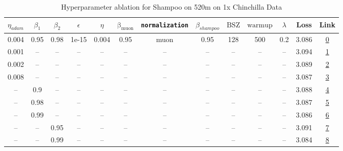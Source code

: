 \begin{table}[H]
\centering
\caption{Hyperparameter ablation for Shampoo on 520m on 1x Chinchilla Data}
\label{tab:ablation_shampoo_520m_1}
\begin{tabular}{ccccccccccccc}
\toprule
$\eta_{adam}$ & $\beta_1$ & $\beta_2$ & $\epsilon$ & $\eta$ & $\mathrm{\beta_{muon}}$ & \texttt{normalization} & $\beta_{shampoo}$ & $\mathrm{BSZ}$ & $\mathrm{warmup}$ & $\lambda$ & Loss & Link \\
\midrule
0.004 & 0.95 & 0.98 & 1e-15 & 0.004 & 0.95 & muon & 0.95 & 128 & 500 & 0.2 & 3.086 & \href{https://wandb.ai/stanford-mercury/optimizer-scaling/runs/sweep-520m-10B-mudamv87e43clr0.004-alr0.004-wd0.2-minlr0-warmup5-152be6}{0} \\
\midrule
0.001 & -- & -- & -- & -- & -- & -- & -- & -- & -- & -- & 3.094 & \href{https://wandb.ai/stanford-mercury/optimizer-scaling/runs/sweep-520m-10B-mudamn9ba1e4lr0.004-alr0.001-wd0.2-minlr0-warmup5-6fa6b2}{1} \\
0.002 & -- & -- & -- & -- & -- & -- & -- & -- & -- & -- & 3.089 & \href{https://wandb.ai/stanford-mercury/optimizer-scaling/runs/sweep-520m-10B-mudamn25bacdlr0.004-alr0.002-wd0.2-minlr0-warmup5-030646}{2} \\
0.008 & -- & -- & -- & -- & -- & -- & -- & -- & -- & -- & 3.087 & \href{https://wandb.ai/stanford-mercury/optimizer-scaling/runs/sweep-520m-10B-mudamna980a6lr0.004-alr0.008-wd0.2-minlr0-warmup5-0c7be5}{3} \\
-- & 0.9 & -- & -- & -- & -- & -- & -- & -- & -- & -- & 3.088 & \href{https://wandb.ai/stanford-mercury/optimizer-scaling/runs/sweep-520m-10B-mudamve61d4flr0.004-alr0.004-wd0.2-minlr0-warmup5-ca21f1}{4} \\
-- & 0.98 & -- & -- & -- & -- & -- & -- & -- & -- & -- & 3.087 & \href{https://wandb.ai/stanford-mercury/optimizer-scaling/runs/sweep-520m-10B-mudamvb97cablr0.004-alr0.004-wd0.2-minlr0-warmup5-4b0f2d}{5} \\
-- & 0.99 & -- & -- & -- & -- & -- & -- & -- & -- & -- & 3.086 & \href{https://wandb.ai/stanford-mercury/optimizer-scaling/runs/sweep-520m-10B-mudamvd9c3a5lr0.004-alr0.004-wd0.2-minlr0-warmup5-a04ebe}{6} \\
-- & -- & 0.95 & -- & -- & -- & -- & -- & -- & -- & -- & 3.091 & \href{https://wandb.ai/stanford-mercury/optimizer-scaling/runs/sweep-520m-10B-mudamv8e0dbblr0.004-alr0.004-wd0.2-minlr0-warmup5-480820}{7} \\
-- & -- & 0.99 & -- & -- & -- & -- & -- & -- & -- & -- & 3.084 & \href{https://wandb.ai/stanford-mercury/optimizer-scaling/runs/sweep-520m-10B-mudamna5bf40lr0.004-alr0.004-wd0.2-minlr0-warmup5-a87ac5}{8} \\

\end{tabular}
\end{table}
